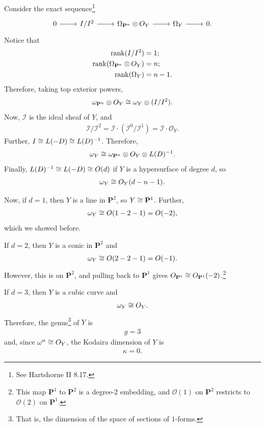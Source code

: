 \documentclass [11 pt, oneside] {article}
\begin{document}
Consider the exact sequence\footnote{See Hartshorne II 8.17.}
\[
\begin{tikzcd}
	0\ar[r] & \mathscr{I}/\mathscr{I}^2 \ar[r] & \Omega_{\mathbf{P}^n}\tensor \mathscr{O}_Y \ar[r] & \Omega_Y\ar[r] &0.
\end{tikzcd}
\]
Notice that
\begin{align*}
	\operatorname{rank} (\relax{I}/\relax{I}^2) &= 1;\\
	\operatorname{rank} (\Omega_{\mathbf{P}^n}\otimes \relax{O}_Y) &= n;\\
	\operatorname{rank} (\Omega_Y) &= n-1.
\end{align*}
Therefore, taking top exterior powers,
\begin{align*}
	\omega_{\mathbf{P}^n} \otimes \relax{O}_Y \cong \omega_Y \otimes (\relax{I}/\relax{I}^2).
\end{align*}
Now, $\mathscr{I}$ is the ideal sheaf of $Y$, and 
\begin{align*}
	\mathscr{I}/\mathscr{I}^2 = \mathscr{I}\cdot (\mathscr{I}^0/\mathscr{I}^1) = \mathscr{I}\cdot  \mathscr{O}_Y.
\end{align*}
Further, $\relax{I}\cong \relax{L}(-D)\cong  \relax{L}(D) ^{-1}$. Therefore,
\begin{align*}
	\omega_Y \cong \omega_{\mathbf{P}^n} \otimes \relax{O}_Y \otimes \relax{L}(D) ^{-1}.
\end{align*}
Finally, $\relax{L}(D) ^{-1} \cong \relax{L}(-D)\cong  \relax{O}(d)$ if $Y$ is a hypersurface of degree $d$, so
\begin{align*}
	\omega_Y \cong \relax{O}_Y(d-n-1).
\end{align*}

\begin{example}[$n=2$]\label{}\text{}
Now, if $d=1$, then $Y$ is a line in $\mathbf{P}^2$, so $Y\cong \mathbf{P}^1$. Further,
\begin{align*}
	\omega_Y \cong \relax{O}(1-2-1)=  \relax{O}(-2),
\end{align*}
which we showed before. 

If $d=2$, then $Y$ is a conic in $\mathbf{P}^2$ and 
\begin{align*}
	\omega_Y \cong \relax{O}(2-2-1) =  \relax{O}(-1).
\end{align*}
However, this is on $\mathbf{P}^2$, and pulling back to $\mathbf{P}^1$ gives $\relax{O}_{\mathbf{P}^1} \cong \relax{O}_{\mathbf{P}^1}(-2)$.\footnote{This map $\mathbf{P}^1$ to $\mathbf{P}^2$ is a degree-$2$ embedding, and $\mathscr{O}(1)$ on $\mathbf{P}^2$ restricts to $\mathscr{O}(2)$ on $\mathbf{P}^1$.}

If $d=3$, then $Y$ is a cubic curve and 
\begin{align*}
	\omega_Y \cong \relax{O}_Y.
\end{align*}
Therefore, the genus\footnote{That is, the dimension of the space of sections of $1$-forms.} of $Y$ is
\begin{align*}
	g = 3
\end{align*}
and, since $\omega^n \cong \relax{O}_Y$, the Kodaira dimension of $Y$ is
\begin{align*}
	\kappa = 0.
\end{align*}
\end{example}
\end{document}
